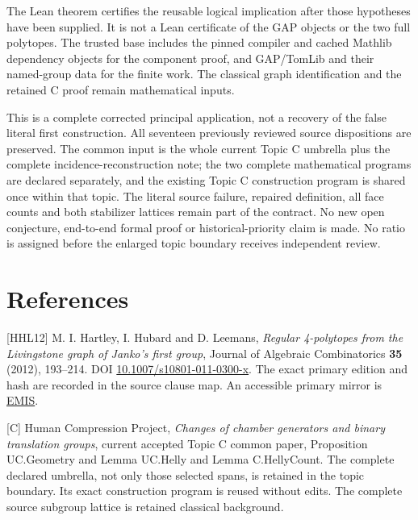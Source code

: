 The Lean theorem certifies the reusable logical implication after those
hypotheses have been supplied. It is not a Lean certificate of the GAP
objects or the two full polytopes. The trusted base includes the pinned
compiler and cached Mathlib dependency objects for the component proof,
and GAP/TomLib and their named-group data for the finite work. The
classical graph identification and the retained C proof remain
mathematical inputs.

This is a complete corrected principal application, not a recovery of the false literal first construction. All seventeen previously reviewed source dispositions are preserved. The common input is the whole current Topic C umbrella plus the complete incidence-reconstruction note; the two complete mathematical programs are declared separately, and the existing Topic C construction program is shared once within that topic. The literal source failure, repaired definition, all face counts and both stabilizer lattices remain part of the contract. No new open conjecture, end-to-end formal proof or historical-priority claim is made. No ratio is assigned before the enlarged topic boundary receives independent review.

\section*{References}\label{references}

{[}HHL12{]} M. I. Hartley, I. Hubard and D. Leemans, \emph{Regular
4-polytopes from the Livingstone graph of Janko's first group}, Journal
of Algebraic Combinatorics \textbf{35} (2012), 193--214. DOI
\href{https://doi.org/10.1007/s10801-011-0300-x}{10.1007/s10801-011-0300-x}.
The exact primary edition and hash are recorded in the source clause map.
An accessible primary mirror is \href{https://emis.de/ft/43964}{EMIS}.

[C] Human Compression Project, \emph{Changes of chamber generators and binary translation groups}, current accepted Topic C common paper, Proposition UC.Geometry and Lemma UC.Helly and Lemma C.HellyCount. The complete declared umbrella, not only those selected spans, is retained in the topic boundary. Its exact construction program is reused without edits. The complete source subgroup lattice is retained classical background.


